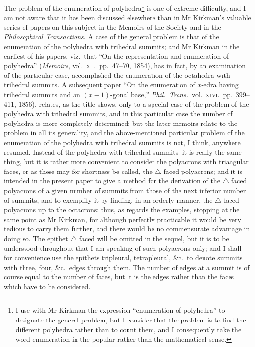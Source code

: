 \documentclass[11pt,a4paper]{article}
\begin{document}
The problem of the enumeration of polyhedra\footnote{I use with Mr Kirkman the expression ``enumeration of polyhedra'' to designate the general problem, but I consider that the problem is to find the different polyhedra rather than to count them, and I consequently take the word enumeration in the popular rather than the mathematical sense.} is one of extreme difficulty, and I am not aware that it has been discussed elsewhere than in Mr Kirkman's valuable series of papers on this subject in the Memoirs of the Society and in the \textit{Philosophical Transactions}. A case of the general problem is that of the enumeration of the polyhedra with trihedral summits; and Mr Kirkman in the earliest of his papers, viz.\ that ``On the representation and enumeration of polyhedra'' (\textit{Memoirs}, vol.\ \textsc{xii}.\ pp.\ 47--70, 1854), has in fact, by an examination of the particular case, accomplished the enumeration of the octahedra with trihedral summits. A subsequent paper ``On the enumeration of $x$-edra having trihedral summits and an $(x-1)$-gonal base,'' \textit{Phil.\ Trans.}\ vol.\ \textsc{xlvi}.\ pp.\ 399--411, 1856), relates, as the title shows, only to a special case of the problem of the polyhedra with trihedral summits, and in this particular case the number of polyhedra is more completely determined; but the later memoirs relate to the problem in all its generality, and the above-mentioned particular problem of the enumeration of the polyhedra with trihedral summits is not, I think, anywhere resumed. Instead of the polyhedra with trihedral summits, it is really the same thing, but it is rather more convenient to consider the polyacrons with triangular faces, or as these may for shortness be called, the $\triangle$ faced polyacrons; and it is intended in the present paper to give a method for the derivation of the $\triangle$ faced polyacrons of a given number of summits from those of the next inferior number of summits, and to exemplify it by finding, in an orderly manner, the $\triangle$ faced polyacrons up to the octacrons: thus, as regards the examples, stopping at the same point as Mr Kirkman, for although perfectly practicable it would be very tedious to carry them further, and there would be no commensurate advantage in doing so. The epithet $\triangle$ faced will be omitted in the sequel, but it is to be understood throughout that I am speaking of such polyacrons only; and I shall for convenience use the epithets tripleural, tetrapleural, \&c.\ to denote summits with three, four, \&c.\ edges through them. The number of edges at a summit is of course equal to the number of faces, but it is the edges rather than the faces which have to be considered.
\end{document}
